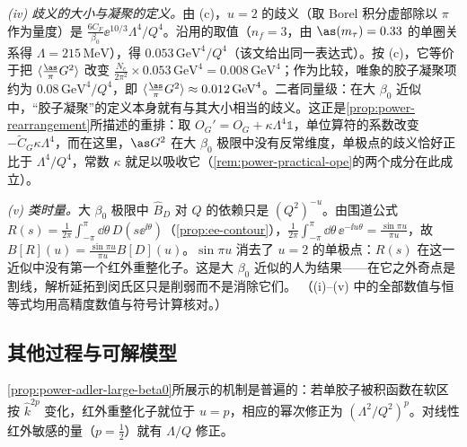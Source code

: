 \begin{example}[带 $n$ 个费米子泡的单胶子]
\emph{(iv) 歧义的大小与凝聚的定义。}由 (c)，$u=2$ 的歧义（取 Borel 积分虚部除以 $\pi$ 作为量度）是 $\frac{6C_F}{\beta_0}\ee^{10/3}\Lambda^4/Q^4$。沿用\cite[脚注~42]{Beneke1999}的取值（$n_f=3$，由 $\as(m_\tau)=0.33$ 的单圈关系得 $\Lambda=215\,\mathrm{MeV}$），得 $0.053\,\mathrm{GeV}^4/Q^4$（该文给出同一表达式\cite[式~(5.12)]{Beneke1999}）。按 (c)，它等价于把 $\langle\frac{\as}{\pi}G^2\rangle$ 改变 $\frac{N_c}{2\pi^2}\times0.053\,\mathrm{GeV}^4=0.008\,\mathrm{GeV}^4$；作为比较，唯象的胶子凝聚项约为 $0.08\,\mathrm{GeV}^4/Q^4$\cite[式~(5.13)]{Beneke1999}，即 $\langle\frac{\as}{\pi}G^2\rangle\approx0.012\,\mathrm{GeV}^4$。二者同量级：在大 $\beta_0$ 近似中，“胶子凝聚”的定义本身就有与其大小相当的歧义。这正是\cref{prop:power-rearrangement}所描述的重排：取 $O_G'=O_G+\kappa\Lambda^4\mathbb 1$，单位算符的系数改变 $-\tilde C_G\kappa\Lambda^4$，而在这里，$\as G^2$ 在大 $\beta_0$ 极限中没有反常维度，单极点的歧义恰好正比于 $\Lambda^4/Q^4$，常数 $\kappa$ 就足以吸收它（\cref{rem:power-practical-ope}的两个成分在此成立）。

\emph{(v) 类时量。}大 $\beta_0$ 极限中 $\hat B_D$ 对 $Q$ 的依赖只是 $(Q^2)^{-u}$。由围道公式 $R(s)=\frac1{2\pi}\int_{-\pi}^{\pi}\dd\theta\,D(s\ee^{\ii\theta})$（\cref{prop:ee-contour}），$\frac1{2\pi}\int_{-\pi}^{\pi}\dd\theta\,\ee^{-\ii u\theta}=\frac{\sin\pi u}{\pi u}$，故 $B[R](u)=\frac{\sin\pi u}{\pi u}B[D](u)$\cite[式~(5.15)]{Beneke1999}。$\sin\pi u$ 消去了 $u=2$ 的单极点：$R(s)$ 在这一近似中没有第一个红外重整化子。这是大 $\beta_0$ 近似的人为结果——在它之外奇点是割线，解析延拓到闵氏区只是削弱而不是消除它们\cite[第~5.2.1~节]{Beneke1999}。
（(i)--(v) 中的全部数值与恒等式均用高精度数值与符号计算核对。）
\end{example}

\subsection{其他过程与可解模型}

\cref{prop:power-adler-large-beta0}所展示的机制是普遍的：若单胶子被积函数在软区按 $\hat k^{2p}$ 变化，红外重整化子就位于 $u=p$，相应的幂次修正为 $(\Lambda^2/Q^2)^p$。对线性红外敏感的量（$p=\frac12$）就有 $\Lambda/Q$ 修正。

